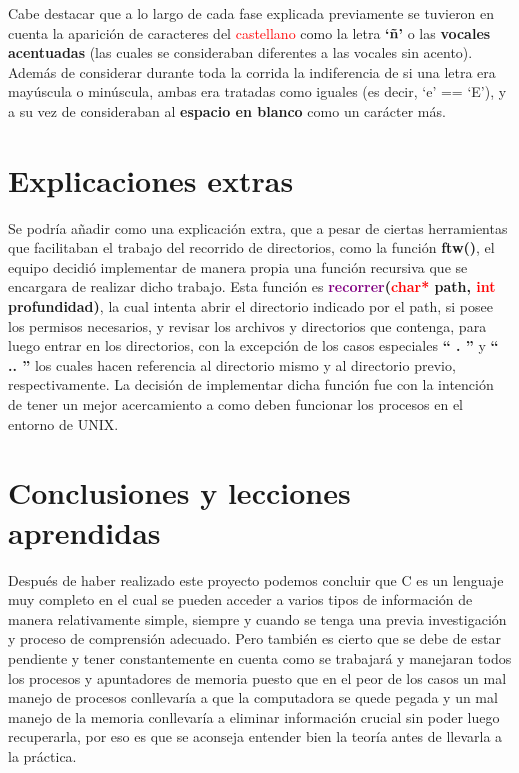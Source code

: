 \documentclass[12pt,letterpaper]{article}
\begin{document}
\quad Cabe destacar que a lo largo de cada fase explicada previamente se tuvieron en cuenta la aparición de caracteres del \textcolor{red}{castellano} como la letra \textbf{`ñ'} o las \textbf{vocales acentuadas} (las cuales se consideraban diferentes a las vocales sin acento). Además de considerar durante toda la corrida la indiferencia de si una letra era mayúscula o minúscula, ambas era tratadas como iguales (es decir, `e' == `E'), y a su vez de consideraban al \textbf{espacio en blanco} como un carácter más. 
\section{Explicaciones extras}

   Se podría añadir como una explicación extra, que a pesar de ciertas herramientas que facilitaban el trabajo del recorrido de directorios, como la función \textbf{ftw()}, el equipo decidió implementar de manera propia una función recursiva que se encargara de realizar dicho trabajo. Esta función es \textbf{\textcolor{purple}{recorrer}(\textcolor{red}{char*} path, \textcolor{red}{int} profundidad)}, la cual intenta abrir el directorio indicado por el path, si posee los permisos necesarios, y revisar los archivos y directorios que contenga, para luego entrar en los directorios, con la excepción de los casos especiales \textbf{`` . ''} y \textbf{`` .. ''} los cuales hacen referencia al directorio mismo y al directorio previo, respectivamente. La decisión de implementar dicha función fue con la intención de tener un mejor acercamiento a como deben funcionar los procesos en el entorno de UNIX.

\section{Conclusiones y lecciones aprendidas}
   Después de haber realizado este proyecto podemos concluir que C es un lenguaje muy completo en el cual se pueden acceder a varios tipos de información de manera relativamente simple, siempre y cuando se tenga una previa investigación y proceso de comprensión adecuado. Pero también es cierto que se debe de estar pendiente y tener constantemente en cuenta como se trabajará y manejaran todos los procesos y apuntadores de memoria puesto que en el peor de los casos un mal manejo de procesos conllevaría a que la computadora se quede pegada y un mal manejo de la memoria conllevaría a eliminar información crucial sin poder luego recuperarla, por eso es que se aconseja entender bien la teoría antes de llevarla a la práctica.
\end{document}
